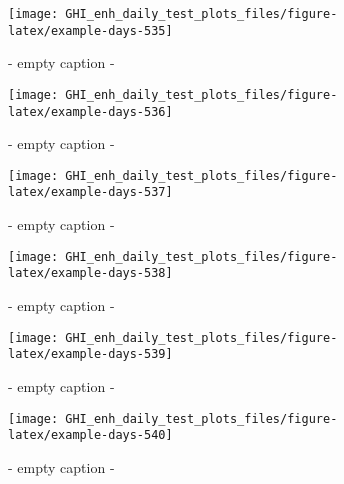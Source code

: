 \documentclass[
  10pt,
  a4paper,oneside]{article}
\begin{document}
\begin{figure}[H]

{\centering \texttt{[image: GHI\_enh\_daily\_test\_plots\_files/figure-latex/example-days-535]} 

}

\caption{ - empty caption - }\label{fig:example-days-535}
\end{figure}

\begin{figure}[H]

{\centering \texttt{[image: GHI\_enh\_daily\_test\_plots\_files/figure-latex/example-days-536]} 

}

\caption{ - empty caption - }\label{fig:example-days-536}
\end{figure}

\begin{figure}[H]

{\centering \texttt{[image: GHI\_enh\_daily\_test\_plots\_files/figure-latex/example-days-537]} 

}

\caption{ - empty caption - }\label{fig:example-days-537}
\end{figure}

\begin{figure}[H]

{\centering \texttt{[image: GHI\_enh\_daily\_test\_plots\_files/figure-latex/example-days-538]} 

}

\caption{ - empty caption - }\label{fig:example-days-538}
\end{figure}

\begin{figure}[H]

{\centering \texttt{[image: GHI\_enh\_daily\_test\_plots\_files/figure-latex/example-days-539]} 

}

\caption{ - empty caption - }\label{fig:example-days-539}
\end{figure}

\begin{figure}[H]

{\centering \texttt{[image: GHI\_enh\_daily\_test\_plots\_files/figure-latex/example-days-540]} 

}

\caption{ - empty caption - }\label{fig:example-days-540}
\end{figure}
\end{document}
